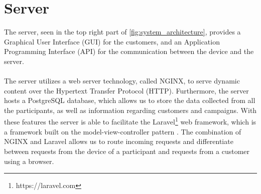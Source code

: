 \section{Server}
\label{sec:server}
The server, seen in the top right part of \ref{fig:system_architecture}, provides a Graphical User Interface (GUI) for the customers, and an Application Programming Interface (API) for the communication between the device and the server.
\\\\
The server utilizes a web server technology, called NGINX, to serve dynamic content over the Hypertext Transfer Protocol (HTTP). Furthermore, the server hosts a PostgreSQL database, which allows us to store the data collected from all the participants, as well as information regarding customers and campaigns. With these features the server is able to facilitate the Laravel\footnote{https://laravel.com} web framework, which is a framework built on the model-view-controller pattern \parencite{leff2001web}. The combination of NGINX and Laravel allows us to route incoming requests and differentiate between requests from the device of a participant and requests from a customer using a browser. 





